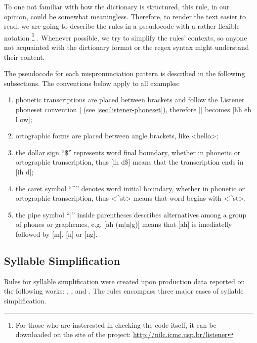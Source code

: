 To one not familiar with how the dictionary is structured, this rule, in our opinion, could be somewhat meaningless. Therefore,  to 
render the text easier to read, we are going to describe the rules in a pseudocode with a rather flexible notation
\footnote{For those who are insterested in checking the code itself, it can be downloaded on the site of the project:
\url{http://nilc.icmc.usp.br/listener}}
.
Whenever possible, we try to simplify the rules' contexts, so anyone not acquainted with the dictionary format or the
\ac{regex} syntax might understand their content.

The pseudocode for each mispronunciation pattern is described in the following subsections. The conventions below apply to all examples:

\begin{enumerate}
 \item phonetic transcriptions are placed between brackets and follow the Listener phoneset convention ]
 (see \autoref{sec:listener-phoneset}), therefore [] becomes [hh eh l ow];
 \item ortographic forms are placed between angle brackets, like <hello>;
 \item the dollar sign ``\$'' represents word final boundary, whether in phonetic or ortographic transcription, 
 thus [ih d\$] means that the transcription ends in [ih d];
 \item the caret symbol ``\textasciicircum'' denotes word initial boundary, whether in phonetic or 
 ortographic transcription, thus <\textasciicircum st> means that word begins with <\textasciicircum st>.
 \item the pipe symbol ``$\vert$'' inside parentheses describes alternatives among a group of phones or 
 graphemes, e.g. [ah (m$\vert$n$\vert$g)] means that [ah] is imediatelly followed by [m], [n] or [ng].
\end{enumerate}

\subsection{Syllable Simplification}
Rules for syllable simplification were created upon production data reported on the following works:
\citeauthor{Cardoso2011} \citep{Cardoso2011}, \citeauthor{Silveira2012} \citep{Silveira2012}
\citeauthor{Rauber2004} \citep{Rauber2004}, and \citeauthor{Rebello2006} \citep{Rebello2006}. The rules
encompass three major cases of syllable simplification. 

